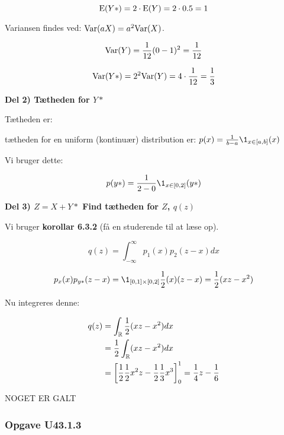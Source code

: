 \begin{equation}
    \text{E}(Y*) = 2 \cdot \text{E}(Y) = 2\cdot 0.5 = 1
\end{equation}

Variansen findes ved: $\text{Var}(aX) = a^2 \text{Var}(X)$.

\begin{equation}
    \text{Var}(Y) = \frac{1}{12}(0 - 1)^2 = \frac{1}{12}
\end{equation}

\begin{equation}
    \text{Var}(Y*) = 2^2 \text{Var}(Y) = 4 \cdot \frac{1}{12} = \frac{1}{3}
\end{equation}

\textbf{Del 2) Tætheden for $Y*$}

Tætheden er:

tætheden for en uniform (kontinuær) distribution er: $p(x) = \frac{1}{b - a}\1_{x \in [a, b]}(x)$

Vi bruger dette:

\begin{equation}
    p(y*) = \frac{1}{2-0}\1_{x \in [0,2]}(y*)
\end{equation}

\textbf{Del 3) $Z = X + Y*$ Find tætheden for $Z$, $q(z)$}

Vi bruger \textbf{korollar 6.3.2} (få en studerende til at læse op).

\begin{equation}
    q(z) = \int_{-\infty}^{\infty} p_{1}(x)p_{2}(z - x) dx
\end{equation}

\begin{equation}
    p_x(x)p_{y*}(z - x) = \1_{[0,1] \times [0,2]}\frac{1}{2}(x)(z-x) = \frac{1}{2}(xz - x^2)
\end{equation}

Nu integreres denne:

\begin{align}
    q(z) &= \int_{\mathbb{R}} \frac{1}{2}(xz - x^2) dx \\
    &= \frac{1}{2} \int_{\mathbb{R}} (xz - x^2) dx \\ 
    &= \left[ \frac{1}{2}\frac{1}{2} x^2 z - \frac{1}{2}\frac{1}{3}x^3\right]_{0} ^{1} = \frac{1}{4}z - \frac{1}{6} 
\end{align}

NOGET ER GALT

\subsubsection{Opgave U43.1.3}

